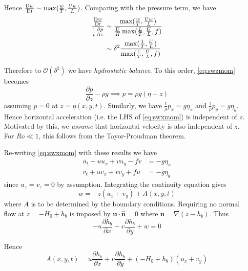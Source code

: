 \documentclass{jknotes}
\newcommand{\Ro}{Ro}
\begin{document}
Hence $\frac{\mathrm{D} w}{\mathrm{D} t} \sim \max(\frac{w}{T}, \frac{Uw}{L})$. Comparing with the
pressure term, we have
\begin{align}
	\frac{\frac{\mathrm{D} w}{\mathrm{D} t}}{\frac{1}{\rho}\frac{\partial p}{\partial
		z}} &\sim \frac{\max(\frac{w}{T},
		\frac{Uw}{L})}{\frac{U}{H}\max(\frac{L}{T}, \frac{U}{L}, f)}\\
		&\sim \delta^2
		\frac{\max(\frac{1}{T},\frac{U}{L})}{\max(\frac{1}{T},\frac{U}{L},f)}
\end{align}

Therefore to $\mathcal{O}(\delta^2)$ we have \emph{hydrostatic balance}. To
this order, \eqref{eq:swzmom} becomes
\begin{equation}
	\frac{\partial p}{\partial z} - \rho g \implies p = \rho g (\eta - z)
\end{equation}
assuming $p = 0$ at $z = \eta(x,y,t)$. Similarly, we have $\frac{1}{\rho} p_x
= g \eta_x$ and $\frac{1}{\rho} p_y = g \eta_y$. Hence horizontal acceleration
(i.e. the LHS of \eqref{eq:swxmom}) is independent of $z$. Motivated by this,
we \emph{assume} that horizontal velocity is also independent of $z$. For $\Ro
\ll 1$, this follows from the Tayor-Proudman theorem.

Re-writing \eqref{eq:swxmom} with these results we have
\begin{align}
	u_t + u u_x + v u_y -fv &= -g \eta_x \label{eq:swx}\\
	v_t + u v_x + v v_y + fu &= -g \eta_y \label{eq:swy}
\end{align}
since $u_z = v_z = 0$ by assumption. Integrating the continuity equation gives
\begin{equation}
	w = -z(u_x + v_y) + A(x,y,t)
\end{equation}
where $A$ is to be determined by the boundary conditions. Requiring no normal
flow at $z = -H_0 + h_b$ is imposed by $\bm{u}\cdot\hat{\bm{n}} = 0$ where
$\bm{n} = \nabla(z-h_b)$. Thus
\begin{equation}
	-u\frac{\partial h_b}{\partial x} -v \frac{\partial h_b}{\partial y} + w = 0
\end{equation}

Hence
\begin{equation}
	A(x,y,t) = u \frac{\partial h_b}{\partial x} + v \frac{\partial
	h_b}{\partial y} + (-H_0 + h_b) (u_x+v_y)
\end{equation}
\end{document}
